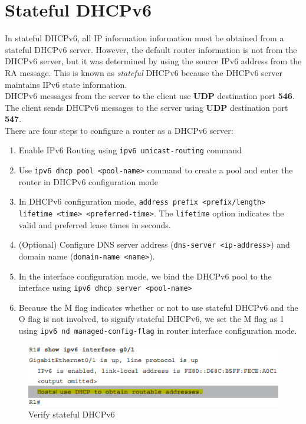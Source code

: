 \section{Stateful DHCPv6}

In stateful DHCPv6, all IP information information must be obtained from a stateful DHCPv6 server. However, the default router information is not from the DHCPv6 server, but
it was determined by using the source IPv6 address from the RA message. This is known as \emph{stateful} DHCPv6 because the DHCPv6 server maintains IPv6 state information.\\

DHCPv6 messages from the server to the client use \textbf{UDP} destination port \textbf{546}. The client sends DHCPv6 messages to the server using \textbf{UDP} destination port \textbf{547}.\\

There are four steps to configure a router as a DHCPv6 server:

\begin{enumerate}
\item Enable IPv6 Routing using \verb|ipv6 unicast-routing| command
\item Use \verb|ipv6 dhcp pool <pool-name>| command to create a pool and enter the router in DHCPv6 configuration mode
\item In DHCPv6 configuration mode, \verb|address prefix <prefix/length> lifetime <time> <preferred-time>|. The \verb|lifetime| option indicates the valid and preferred lease times in seconds.
\item (Optional) Configure DNS server address (\verb|dns-server <ip-address>|) and domain name (\verb|domain-name <name>|).
\item In the interface configuration mode, we bind the DHCPv6 pool to the interface using \verb|ipv6 dhcp server <pool-name>|
\item Because the M flag indicates whether or not to use stateful DHCPv6 and the O flag is not involved, to signify stateful DHCPv6, we set the M flag as 1 using \verb|ipv6 nd managed-config-flag| in router interface configuration mode.
\end{enumerate}

\begin{figure}[hbtp]
\caption{Verify stateful DHCPv6}
\centering
\includegraphics[scale=0.8]{pictures/Stateful-DHCPv6.PNG}
\end{figure}


